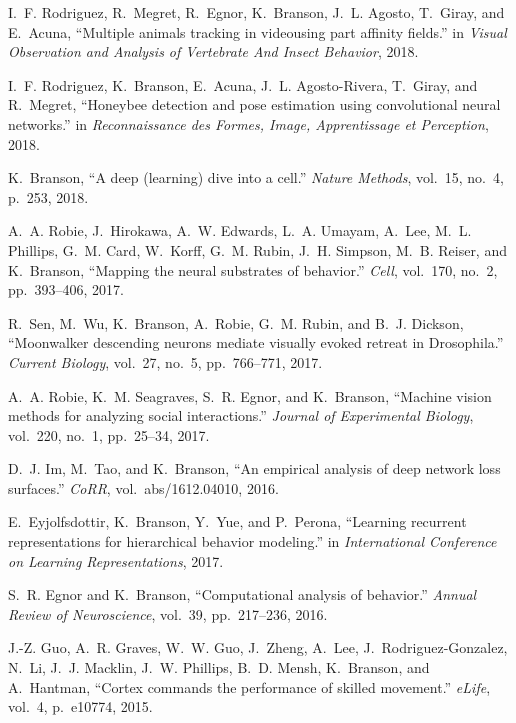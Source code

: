 \begin{cvenum}
\item I.~F. Rodriguez, R.~Megret, R.~Egnor, K.~Branson, J.~L. Agosto, T.~Giray, and
  E.~Acuna, ``Multiple animals tracking in videousing part affinity fields.''
  in {\em Visual Observation and Analysis of Vertebrate And Insect Behavior},
  2018.

\item I.~F. Rodriguez, K.~Branson, E.~Acuna, J.~L. Agosto-Rivera, T.~Giray, and
  R.~Megret, ``Honeybee detection and pose estimation using convolutional
  neural networks.'' in {\em Reconnaissance des Formes, Image, Apprentissage et
  Perception}, 2018.

\item K.~Branson, ``A deep (learning) dive into a cell.'' {\em Nature Methods},
  vol.~15, no.~4, p.~253, 2018.

\item A.~A. Robie, J.~Hirokawa, A.~W. Edwards, L.~A. Umayam,
  A.~Lee, M.~L. Phillips, G.~M. Card, W.~Korff, G.~M. Rubin, J.~H. Simpson,
  M.~B. Reiser, and K.~Branson, ``Mapping the neural substrates of behavior.''
  {\em Cell}, vol.~170, no.~2, pp.~393--406, 2017.

\item R.~Sen, M.~Wu, K.~Branson, A.~Robie, G.~M. Rubin, and B.~J. Dickson,
  ``Moonwalker descending neurons mediate visually evoked retreat in
  {D}rosophila.'' {\em Current Biology}, vol.~27, no.~5, pp.~766--771, 2017.

\item A.~A. Robie, K.~M. Seagraves, S.~R. Egnor, and K.~Branson, ``Machine vision
  methods for analyzing social interactions.'' {\em Journal of Experimental
  Biology}, vol.~220, no.~1, pp.~25--34, 2017.

\item D.~J. Im, M.~Tao, and K.~Branson, ``An empirical analysis of deep network loss
  surfaces.'' {\em CoRR}, vol.~abs/1612.04010, 2016.

\item E.~Eyjolfsdottir, K.~Branson, Y.~Yue, and P.~Perona,
  ``Learning recurrent representations for hierarchical behavior modeling.'' in
  {\em International Conference on Learning Representations},
  2017.

\item S.~R. Egnor and K.~Branson, ``Computational analysis of behavior.'' {\em Annual
  Review of Neuroscience}, vol.~39, pp.~217--236, 2016.

\item J.-Z. Guo, A.~R. Graves, W.~W. Guo, J.~Zheng, A.~Lee,
  J.~Rodriguez-Gonzalez, N.~Li, J.~J. Macklin, J.~W. Phillips, B.~D. Mensh,
  K.~Branson, and A.~Hantman, ``Cortex commands the performance of skilled
  movement.'' {\em e{L}ife}, vol.~4, p.~e10774, 2015.


\end{cvenum}
